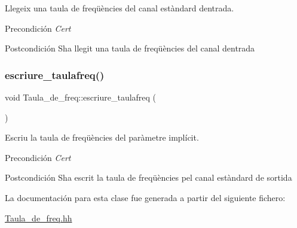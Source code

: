 Llegeix una taula de freqüències del canal estàndard d\textquotesingle{}entrada. 

\begin{DoxyPrecond}{Precondición}
{\itshape Cert} 
\end{DoxyPrecond}
\begin{DoxyPostcond}{Postcondición}
S\textquotesingle{}ha llegit una taula de freqüències del canal d\textquotesingle{}entrada 
\end{DoxyPostcond}
\mbox{\label{class_taula__de__freq_a2b05df9845a043e67775f923bdfd60a0}} 
\subsubsection{\texorpdfstring{escriure\+\_\+taulafreq()}{escriure\_taulafreq()}}
{\footnotesize\ttfamily void Taula\+\_\+de\+\_\+freq\+::escriure\+\_\+taulafreq (\begin{DoxyParamCaption}{ }\end{DoxyParamCaption})}



Escriu la taula de freqüències del paràmetre implícit. 

\begin{DoxyPrecond}{Precondición}
{\itshape Cert} 
\end{DoxyPrecond}
\begin{DoxyPostcond}{Postcondición}
S\textquotesingle{}ha escrit la taula de freqüències pel canal estàndard de sortida 
\end{DoxyPostcond}


La documentación para esta clase fue generada a partir del siguiente fichero\+:\begin{DoxyCompactItemize}
\item 
\hyperlink{_taula__de__freq_8hh}{Taula\+\_\+de\+\_\+freq.\+hh}\end{DoxyCompactItemize}
